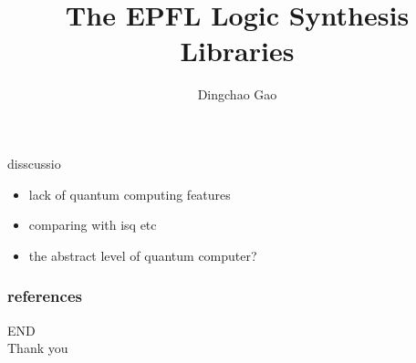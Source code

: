 \documentclass[aspectratio=1610]{beamer}
\title[logic synthesis libraries]{The EPFL Logic Synthesis Libraries}
\author[Gcc]{Dingchao Gao}
\institute[ISCAS]{Institute of Software Chinese Academy of Sciences}
\begin{document}
\begin{frame}[plain]
  \titlepage
\end{frame}





\begin{frame}{disscussio}
  \begin{itemize}
    \item lack of quantum computing features
    \item comparing with isq etc
    \item the abstract level of quantum computer? 
  \end{itemize}
\end{frame}

\begin{frame}
	\frametitle{references}
	\printbibliography
\end{frame}

\begin{frame}
\centering
\Huge{END\\Thank you}
\end{frame}
\end{document}

